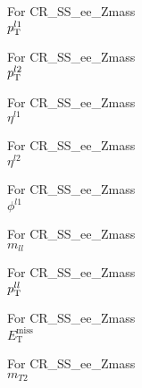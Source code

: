\begin{frame}{For CR\_SS\_ee\_Zmass \\ $p_{\text{T}}^{l1}$}
\end{frame}

\begin{frame}{For CR\_SS\_ee\_Zmass \\ $p_{\text{T}}^{l2}$}
\end{frame}

\begin{frame}{For CR\_SS\_ee\_Zmass \\ $\eta^{l1}$}
\end{frame}

\begin{frame}{For CR\_SS\_ee\_Zmass \\ $\eta^{l2}$}
\end{frame}

\begin{frame}{For CR\_SS\_ee\_Zmass \\ $\phi^{l1}$}
\end{frame}

\begin{frame}{For CR\_SS\_ee\_Zmass \\ $m_{ll}$}
\end{frame}

\begin{frame}{For CR\_SS\_ee\_Zmass \\ $p_{\text{T}}^{ll}$}
\end{frame}

\begin{frame}{For CR\_SS\_ee\_Zmass \\ $E_{\text{T}}^{\text{miss}}$}
\end{frame}

\begin{frame}{For CR\_SS\_ee\_Zmass \\ $m_{T2}$}
\end{frame}

